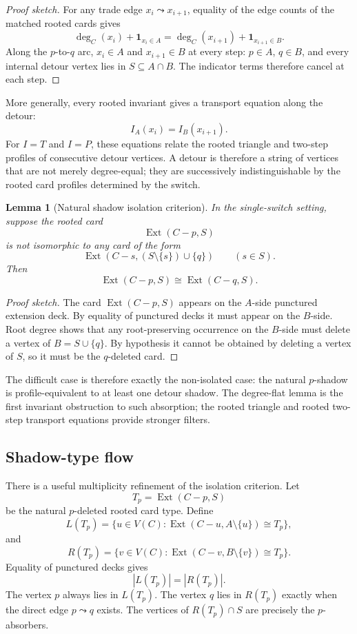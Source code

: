 \documentclass[11pt]{article}
\newtheorem{lemma}{Lemma}
\newcommand{\Ext}{\operatorname{Ext}}
\newcommand{\one}{\mathbf{1}}
\begin{document}
\begin{proof}[Proof sketch]
For any trade edge \(x_i\leadsto x_{i+1}\), equality of the edge counts of
the matched rooted cards gives
\[
  \deg_C(x_i)+\one_{x_i\in A}
  =
  \deg_C(x_{i+1})+\one_{x_{i+1}\in B}.
\]
Along the \(p\)-to-\(q\) arc, \(x_i\in A\) and \(x_{i+1}\in B\) at every
step: \(p\in A\), \(q\in B\), and every internal detour vertex lies in
\(S\subseteq A\cap B\).  The indicator terms therefore cancel at each step.
\end{proof}

More generally, every rooted invariant gives a transport equation along the
detour:
\[
  I_A(x_i)=I_B(x_{i+1}).
\]
For \(I=T\) and \(I=P\), these equations relate the rooted triangle and
two-step profiles of consecutive detour vertices.  A detour is therefore a
string of vertices that are not merely degree-equal; they are successively
indistinguishable by the rooted card profiles determined by the switch.

\begin{lemma}[Natural shadow isolation criterion]
In the single-switch setting, suppose the rooted card
\[
  \Ext(C-p,S)
\]
is not isomorphic to any card of the form
\[
  \Ext(C-s,(S\setminus\{s\})\cup\{q\})
  \qquad (s\in S).
\]
Then
\[
  \Ext(C-p,S)\cong \Ext(C-q,S).
\]
\end{lemma}

\begin{proof}[Proof sketch]
The card \(\Ext(C-p,S)\) appears on the \(A\)-side punctured extension deck.
By equality of punctured decks it must appear on the \(B\)-side.  Root degree
shows that any root-preserving occurrence on the \(B\)-side must delete a
vertex of \(B=S\cup\{q\}\).  By hypothesis it cannot be obtained by deleting
a vertex of \(S\), so it must be the \(q\)-deleted card.
\end{proof}

The difficult case is therefore exactly the non-isolated case: the natural
\(p\)-shadow is profile-equivalent to at least one detour shadow.  The
degree-flat lemma is the first invariant obstruction to such absorption; the
rooted triangle and rooted two-step transport equations provide stronger
filters.

\subsection{Shadow-type flow}

There is a useful multiplicity refinement of the isolation criterion.  Let
\[
  T_p=\Ext(C-p,S)
\]
be the natural \(p\)-deleted rooted card type.  Define
\[
  L(T_p)=\{u\in V(C):\Ext(C-u,A\setminus\{u\})\cong T_p\},
\]
and
\[
  R(T_p)=\{v\in V(C):\Ext(C-v,B\setminus\{v\})\cong T_p\}.
\]
Equality of punctured decks gives
\[
  |L(T_p)|=|R(T_p)|.
\]
The vertex \(p\) always lies in \(L(T_p)\).  The vertex \(q\) lies in
\(R(T_p)\) exactly when the direct edge \(p\leadsto q\) exists.  The vertices
of \(R(T_p)\cap S\) are precisely the \(p\)-absorbers.
\end{document}
